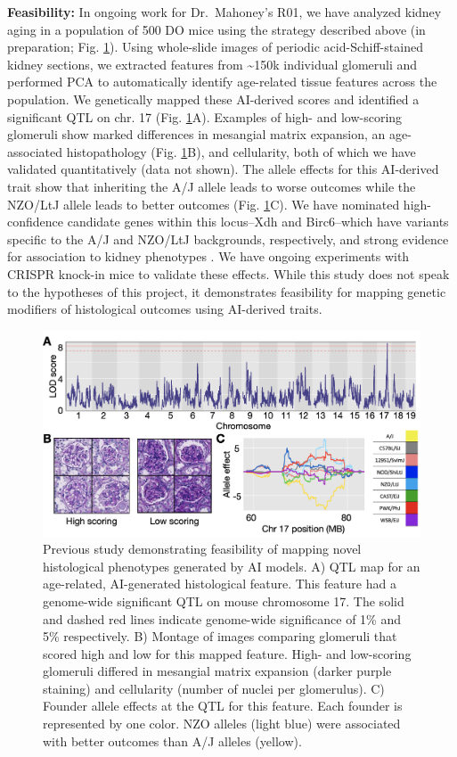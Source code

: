 \documentclass[
  12pt,
]{article}
\begin{document}
\textbf{Feasibility:} In ongoing work for Dr.~Mahoney's R01, we have
analyzed kidney aging in a population of 500 DO mice using the strategy
described above (in preparation; Fig. \ref{fig:histo}). Using
whole-slide images of periodic acid-Schiff-stained kidney sections, we
extracted features from \textasciitilde150k individual glomeruli and
performed PCA to automatically identify age-related tissue features
across the population. We genetically mapped these AI-derived scores and
identified a significant QTL on chr. 17 (Fig. \ref{fig:histo}A).
Examples of high- and low-scoring glomeruli show marked differences in
mesangial matrix expansion, an age-associated histopathology (Fig.
\ref{fig:histo}B), and cellularity, both of which we have validated
quantitatively (data not shown). The allele effects for this AI-derived
trait show that inheriting the A/J allele leads to worse outcomes while
the NZO/LtJ allele leads to better outcomes (Fig. \ref{fig:histo}C). We
have nominated high-confidence candidate genes within this locus--Xdh
and Birc6--which have variants specific to the A/J and NZO/LtJ
backgrounds, respectively, and strong evidence for association to kidney
phenotypes \cite{23249873, 29795190}. We have ongoing experiments with
CRISPR knock-in mice to validate these effects. While this study does
not speak to the hypotheses of this project, it demonstrates feasibility
for mapping genetic modifiers of histological outcomes using AI-derived
traits.

\begin{figure}[ht!]
\includegraphics[width=\textwidth]{Fig4.png} 
\caption{Previous study demonstrating feasibility of mapping novel histological phenotypes generated by AI models. A) QTL map for an age-related, AI-generated histological feature. This feature had a genome-wide significant QTL on mouse chromosome 17. The solid and dashed red lines indicate genome-wide significance of 1\% and 5\% respectively. B) Montage of images comparing glomeruli that scored high and low for this mapped feature. High- and low-scoring glomeruli differed in mesangial matrix expansion (darker purple staining) and cellularity (number of nuclei per glomerulus). C) Founder allele effects at the QTL for this feature. Each founder is represented by one color. NZO alleles (light blue) were associated with better outcomes than A/J alleles (yellow).}
\label{fig:histo}
\end{figure}
\end{document}
